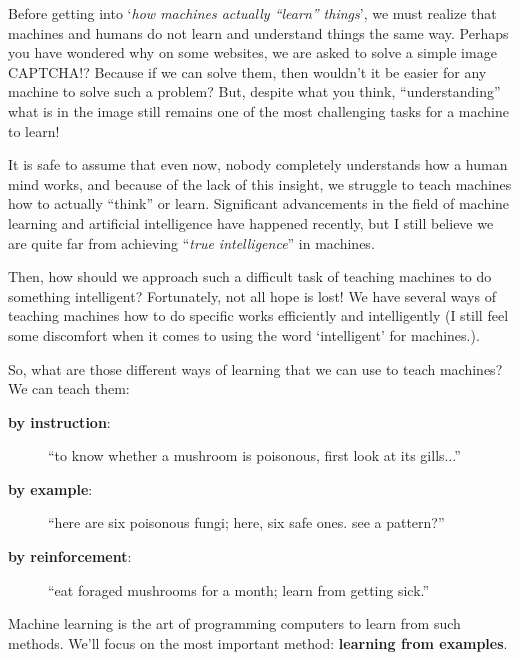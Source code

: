 

Before getting into `\emph{how machines actually ``learn'' things}', we must realize that machines and humans do not learn and understand things the same way. Perhaps you have wondered why on some websites, we are asked to solve a simple image CAPTCHA!? Because if we can solve them, then wouldn't it be easier for any machine to solve such a problem? But, despite what you think, ``understanding'' what is in the image still remains one of the most challenging tasks for a machine to learn!
  
It is safe to assume that even now, nobody completely understands how a human mind works, and because of the lack of this insight, we struggle to teach machines how to actually ``think'' or learn. Significant advancements in the field of machine learning and artificial intelligence have happened recently, but I still believe we are quite far from achieving ``\emph{true intelligence}'' in machines.

Then, how should we approach such a difficult task of teaching machines to do something intelligent? Fortunately, not all hope is lost! We have several ways of teaching machines how to do specific works efficiently and intelligently (I still feel some discomfort when it comes to using the word `intelligent' for machines.).

  So, what are those different ways of learning that we can use to teach machines? We can teach them:
  \begin{description}
    \item[\textbf{by instruction}:  ]  ``to know whether a mushroom is poisonous, first look at its gills...''
    \item[\textbf{by example}:      ]  ``here are six poisonous fungi; here, six safe ones.  see a pattern?''
    \item[\textbf{by reinforcement}:]  ``eat foraged mushrooms for a month; learn from getting sick.''
  \end{description}
  Machine learning is the art of programming computers to learn from such
  methods.  We'll focus on the most important method: \textbf{learning from
  examples}.


